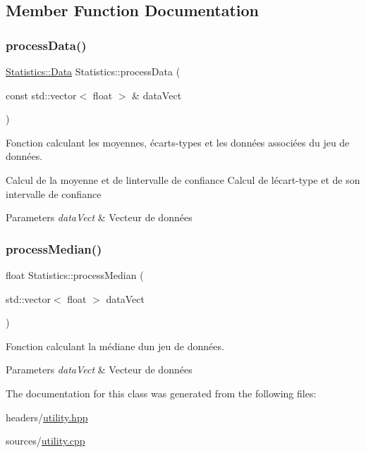 \subsection{Member Function Documentation}
\mbox{\label{classStatistics_aaa2152a3f262ce8d003663f993420c4c}} 
\subsubsection{\texorpdfstring{process\+Data()}{processData()}}
{\footnotesize\ttfamily \hyperlink{structStatistics_1_1Data}{Statistics\+::\+Data} Statistics\+::process\+Data (\begin{DoxyParamCaption}\item[{const std\+::vector$<$ float $>$ \&}]{data\+Vect }\end{DoxyParamCaption})\hspace{0.3cm}{\ttfamily [static]}}



Fonction calculant les moyennes, écarts-\/types et les données associées du jeu de données. 

Calcul de la moyenne et de l\textquotesingle{}intervalle de confiance Calcul de l\textquotesingle{}écart-\/type et de son intervalle de confiance 
\begin{DoxyParams}{Parameters}
{\em data\+Vect} & Vecteur de données \\
\hline
\end{DoxyParams}
\mbox{\label{classStatistics_ae1c12077162711aa0ea8b4ee6e15b4da}} 
\subsubsection{\texorpdfstring{process\+Median()}{processMedian()}}
{\footnotesize\ttfamily float Statistics\+::process\+Median (\begin{DoxyParamCaption}\item[{std\+::vector$<$ float $>$}]{data\+Vect }\end{DoxyParamCaption})\hspace{0.3cm}{\ttfamily [static]}}



Fonction calculant la médiane d\textquotesingle{}un jeu de données. 


\begin{DoxyParams}{Parameters}
{\em data\+Vect} & Vecteur de données \\
\hline
\end{DoxyParams}


The documentation for this class was generated from the following files\+:\begin{DoxyCompactItemize}
\item 
headers/\hyperlink{utility_8hpp}{utility.\+hpp}\item 
sources/\hyperlink{utility_8cpp}{utility.\+cpp}\end{DoxyCompactItemize}

